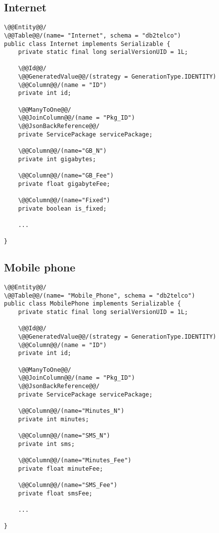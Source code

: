 \subsection*{Internet}

\begin{lstlisting}[style = JPA]
\@@Entity@@/
\@@Table@@/(name= "Internet", schema = "db2telco")
public class Internet implements Serializable {
    private static final long serialVersionUID = 1L;

    \@@Id@@/
    \@@GeneratedValue@@/(strategy = GenerationType.IDENTITY)
    \@@Column@@/(name = "ID")
    private int id;

    \@@ManyToOne@@/
    \@@JoinColumn@@/(name = "Pkg_ID")
    \@@JsonBackReference@@/
    private ServicePackage servicePackage;

    \@@Column@@/(name="GB_N")
    private int gigabytes;

    \@@Column@@/(name="GB_Fee")
    private float gigabyteFee;

    \@@Column@@/(name="Fixed")
    private boolean is_fixed;
    
    ...

}
\end{lstlisting}

\subsection*{Mobile phone}

\begin{lstlisting}[style = JPA]
\@@Entity@@/
\@@Table@@/(name= "Mobile_Phone", schema = "db2telco")
public class MobilePhone implements Serializable {
    private static final long serialVersionUID = 1L;

    \@@Id@@/
    \@@GeneratedValue@@/(strategy = GenerationType.IDENTITY)
    \@@Column@@/(name = "ID")
    private int id;

    \@@ManyToOne@@/
    \@@JoinColumn@@/(name = "Pkg_ID")
    \@@JsonBackReference@@/
    private ServicePackage servicePackage;

    \@@Column@@/(name="Minutes_N")
    private int minutes;

    \@@Column@@/(name="SMS_N")
    private int sms;

    \@@Column@@/(name="Minutes_Fee")
    private float minuteFee;

    \@@Column@@/(name="SMS_Fee")
    private float smsFee;
    
    ...

}
\end{lstlisting}

